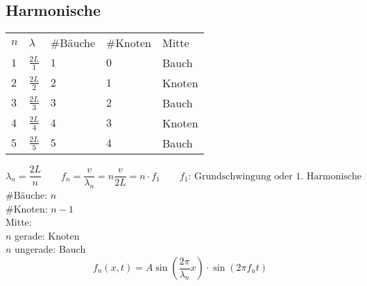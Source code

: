 \subsection{Harmonische}
\begin{tabular}{lllll}
\rowcolor{white} $n$ & $\lambda$       & \#Bäuche & \#Knoten & Mitte \\
\rowcolor{lgray} $1$ & $\frac{2 L}{1}$ & $1$      & $0$      & Bauch \\
\rowcolor{white} $2$ & $\frac{2 L}{2}$ & $2$      & $1$      & Knoten \\
\rowcolor{lgray} $3$ & $\frac{2 L}{3}$ & $3$      & $2$      & Bauch \\
\rowcolor{white} $4$ & $\frac{2 L}{4}$ & $4$      & $3$      & Knoten \\
\rowcolor{lgray} $5$ & $\frac{2 L}{5}$ & $5$      & $4$      & Bauch \\
\end{tabular}
\[ \lambda_n = \frac{2 L}{n} \qquad f_n = \frac{v}{\lambda_n} 
= n \frac{v}{2 L} = n \cdot f_1 \qquad \text{$f_1$: Grundschwingung oder 1. Harmonische}\]
\#Bäuche: $n$ \\
\#Knoten: $n - 1$ \\
Mitte: \\
$n$ gerade: Knoten \\
$n$ ungerade: Bauch
\[ f_n(x, t) 
= A \sin\left(\frac{2 \pi}{\lambda_n} x\right) \cdot \sin(2 \pi f_u t) \]